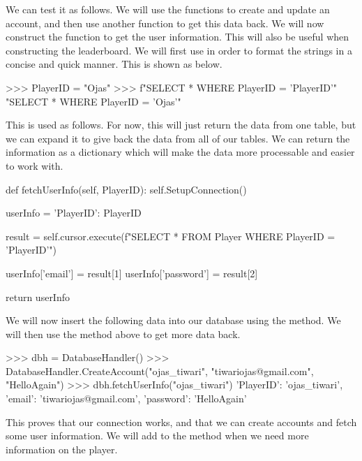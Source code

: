 \vs
We can test it as follows. We will use the functions to create and update an account, and then use another function to get this data back. We will now construct the function to get the user information. This will also be useful when constructing the leaderboard. We will first use  in order to format the strings in a concise and quick manner. This is shown as below.

\vs
\begin{mpy}
>>> PlayerID = "Ojas"
>>> f"SELECT * WHERE PlayerID = '{PlayerID}'"
"SELECT * WHERE PlayerID = 'Ojas'"
\end{mpy}

\vs
This is used as follows. For now, this will just return the data from one table, but we can expand it to give back the data from all of our tables. We can return the information as a dictionary which will make the data more processable and easier to work with.

\vs
\begin{mpy}
    def fetchUserInfo(self, PlayerID):
        self.SetupConnection()

        userInfo = {'PlayerID': PlayerID}

        result = self.cursor.execute(f"SELECT * FROM Player WHERE PlayerID = '{PlayerID}'")

        userInfo['email'] = result[1]
        userInfo['password'] = result[2]

        return userInfo
\end{mpy}

We will now insert the following data into our database using the  method. We will then use the method above to get more data back.

\begin{mpy}
>>> dbh = DatabaseHandler()
>>> DatabaseHandler.CreateAccount("ojas_tiwari", "tiwariojas@gmail.com", "HelloAgain")
>>> dbh.fetchUserInfo("ojas_tiwari")
{'PlayerID': 'ojas_tiwari', 'email': 'tiwariojas@gmail.com', 'password': 'HelloAgain'}
\end{mpy}

This proves that our connection works, and that we can create accounts and fetch some user information. We will add to the  method when we need more information on the player.
\vs


